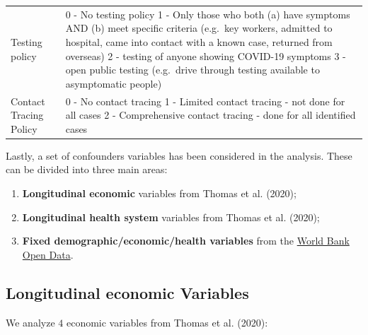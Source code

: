\documentclass[
  6pt,
]{article}
\begin{document}
\begin{longtable}[]{@{}ll@{}}
\begin{minipage}[t]{0.09\columnwidth}
Testing policy\strut
\end{minipage} & \begin{minipage}[t]{0.85\columnwidth}\raggedright
0 - No testing policy 1 - Only those who both (a) have symptoms AND (b)
meet specific criteria (e.g.~key workers, admitted to hospital, came
into contact with a known case, returned from overseas) 2 - testing of
anyone showing COVID-19 symptoms 3 - open public testing (e.g.~drive
through testing available to asymptomatic people)\strut
\end{minipage}\tabularnewline
\begin{minipage}[t]{0.09\columnwidth}\raggedright
Contact Tracing Policy\strut
\end{minipage} & \begin{minipage}[t]{0.85\columnwidth}\raggedright
0 - No contact tracing 1 - Limited contact tracing - not done for all
cases 2 - Comprehensive contact tracing - done for all identified
cases\strut
\end{minipage}\tabularnewline
\bottomrule
\end{longtable}

Lastly, a set of confounders variables has been considered in the
analysis. These can be divided into three main areas:

\begin{enumerate}
\def\labelenumi{\arabic{enumi}.}
\item
  \textbf{Longitudinal economic} variables from Thomas et al. (2020);
\item
  \textbf{Longitudinal health system} variables from Thomas et al.
  (2020);
\item
  \textbf{Fixed demographic/economic/health variables} from the
  \href{https://data.worldbank.org/}{World Bank Open Data}.
\end{enumerate}

\hypertarget{longitudinal-economic-variables}{%
\subsection{Longitudinal economic
Variables}\label{longitudinal-economic-variables}}

We analyze \(4\) economic variables from Thomas et al. (2020):
\end{document}
